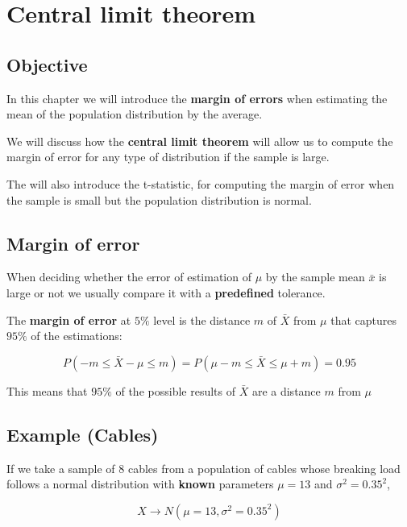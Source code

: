 \documentclass[
]{book}
\begin{document}
\hypertarget{central-limit-theorem}{%
\chapter{Central limit theorem}\label{central-limit-theorem}}

\hypertarget{objective-7}{%
\section{Objective}\label{objective-7}}

In this chapter we will introduce the \textbf{margin of errors} when estimating the mean of the population distribution by the average.

We will discuss how the \textbf{central limit theorem} will allow us to compute the margin of error for any type of distribution if the sample is large.

The will also introduce the t-statistic, for computing the margin of error when the sample is small but the population distribution is normal.

\hypertarget{margin-of-error}{%
\section{Margin of error}\label{margin-of-error}}

When deciding whether the error of estimation of \(\mu\) by the sample mean \(\bar{x}\) is large or not we usually compare it with a \textbf{predefined} tolerance.

The \textbf{margin of error} at \(5\%\) level is the distance \(m\) of \(\bar{X}\) from \(\mu\) that captures \(95\%\) of the estimations:

\[P(-m \leq \bar{X}-\mu \leq m)=P(\mu-m \leq \bar{X} \leq\mu + m)=0.95\]

This means that \(95\%\) of the possible results of \(\bar{X}\) are a distance \(m\) from \(\mu\)

\hypertarget{example-cables}{%
\section{Example (Cables)}\label{example-cables}}

If we take a sample of \(8\) cables from a population of cables whose breaking load follows a normal distribution with \textbf{known} parameters \(\mu=13\) and \(\sigma^2=0.35^2\),

\[X \rightarrow N(\mu=13, \sigma^2=0.35^2)\]
\end{document}

